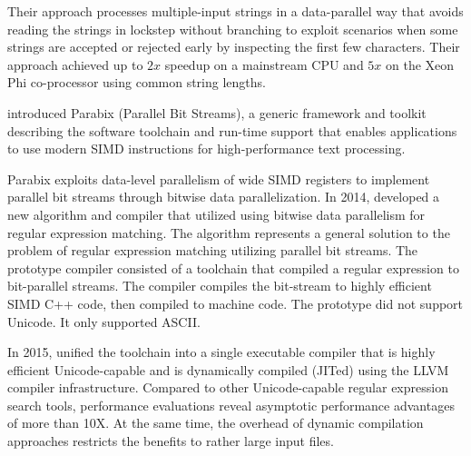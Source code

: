 Their approach processes multiple-input strings in a data-parallel way that avoids reading the strings in lockstep without branching to exploit scenarios when some strings are accepted or rejected early by inspecting the first few characters. Their approach achieved up to $2x$ speedup on a mainstream CPU and $5x$ on the Xeon Phi co-processor using common string lengths.


\citet{parabixorg} introduced Parabix (Parallel Bit Streams), a generic framework and toolkit describing the software toolchain and run-time support that enables applications to use modern SIMD instructions for high-performance text processing.

Parabix exploits data-level parallelism of wide SIMD registers to implement parallel bit streams through bitwise data parallelization. In 2014, \citet{parabixregexnew} developed a new algorithm and compiler that utilized using bitwise data parallelism for regular expression matching. The algorithm represents a general solution to the problem of regular expression matching utilizing parallel bit streams. The prototype compiler consisted of a toolchain that compiled a regular expression to bit-parallel streams. The compiler compiles the bit-stream to highly efficient SIMD C++ code, then compiled to machine code. The prototype did not support Unicode. It only supported ASCII.

In 2015, \citet{parabix} unified the toolchain into a single executable compiler that is highly efficient Unicode-capable and is dynamically compiled (JITed) using the LLVM compiler infrastructure. Compared to other Unicode-capable regular expression search tools, performance evaluations reveal asymptotic performance advantages of more than 10X. At the same time, the overhead of dynamic compilation approaches restricts the benefits to rather large input files.